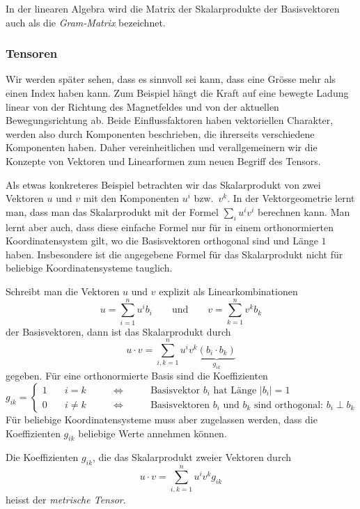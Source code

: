 In der linearen Algebra wird die Matrix der Skalarprodukte der
Basisvektoren auch als die \emph{Gram-Matrix}
%
bezeichnet.

%
%
\subsubsection{Tensoren}
Wir werden später sehen, dass es sinnvoll sei kann, dass eine Grösse
mehr als einen Index haben kann.
Zum Beispiel hängt die Kraft auf eine bewegte Ladung linear von der
Richtung des Magnetfeldes und von der aktuellen Bewegungsrichtung ab.
Beide Einflussfaktoren haben vektoriellen Charakter, werden also durch
Komponenten beschrieben, die ihrerseits verschiedene Komponenten haben.
Daher vereinheitlichen und verallgemeinern wir die Konzepte von Vektoren
und Linearformen zum neuen Begriff des Tensors.

Als etwas konkreteres Beispiel betrachten wir das Skalarprodukt von
zwei Vektoren $u$ und $v$ mit den Komponenten $u^i$ bzw.~$v^k$.
In der Vektorgeometrie lernt man, dass man das Skalarprodukt mit der
Formel $\sum_i u^iv^i$ berechnen kann.
Man lernt aber auch, dass diese einfache Formel nur für in einem
orthonormierten Koordinatensystem gilt, wo die Basisvektoren
orthogonal sind und Länge $1$ haben.
Insbesondere ist die angegebene Formel für das Skalarprodukt nicht
für beliebige Koordinatensysteme tauglich.

Schreibt man die Vektoren $u$ und $v$ explizit als Linearkombinationen
\[
u = \sum_{i=1}^n u^i b_i
\qquad\text{und}\qquad
v = \sum_{k=1}^n v^k b_k
\]
der Basisvektoren, dann ist das Skalarprodukt durch
\[
u\cdot v
=
\sum_{i,k=1}^n u^iv^k \underbrace{(b_i\cdot b_k)}_{\displaystyle g_{ik}}
\]
gegeben.
Für eine orthonormierte Basis sind die Koeffizienten
\[
g_{ik}
=
\left\{
\begin{array}{llcl}
1&\quad i=k&\qquad\Leftrightarrow\qquad&\text{Basisvektor $b_i$ hat Länge $|b_i|=1$}\\
0&\quad i\ne k&\qquad\Leftrightarrow\qquad&\text{Basisvektoren $b_i$ und $b_k$ sind orthogonal: $b_i\perp b_k$}
\end{array}
\right.
\]
Für beliebige Koordinatensysteme muss aber zugelassen werden, dass 
die Koeffizienten $g_{ik}$ beliebige Werte annehmen können.

\begin{definition}
Die Koeffizienten $g_{ik}$, die das Skalarprodukt zweier Vektoren durch
\[
u\cdot v
=
\sum_{i,k=1}^n u^iv^k g_{ik}
\]
heisst der {\em metrische Tensor}.
%
\end{definition}

